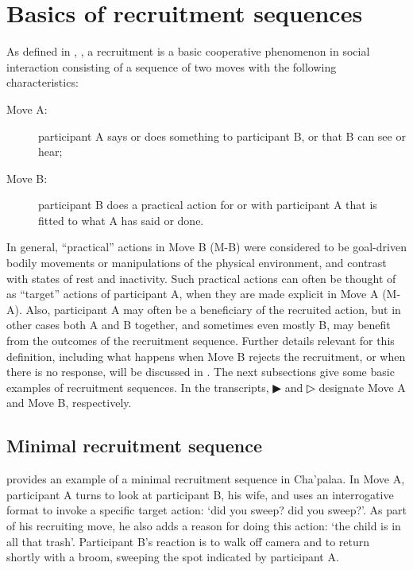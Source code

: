 \documentclass[output=paper]{langsci/langscibook}
\begin{document}
\section{Basics of recruitment sequences}\label{sec:floyd:2}

As defined in , , a recruitment is a basic cooperative phenomenon in social interaction consisting of a sequence of two moves with the following characteristics:

\begin{description}
\item[Move A:] participant A says or does something to participant B, or that B can see or hear;
\item[Move B:] participant B does a practical action for or with participant A that is fitted to what A has said or done.
\end{description}

In general, “practical” actions in Move B (M-B) were considered to be goal-driven bodily movements or manipulations of the physical environment, and contrast with states of rest and inactivity. Such practical actions can often be thought of as “target” actions of participant A, when they are made explicit in Move A (M-A). Also, participant A may often be a beneficiary of the recruited action, but in other cases both A and B together, and sometimes even mostly B, may benefit from the outcomes of the recruitment sequence. Further details relevant for this definition, including what happens when Move B rejects the recruitment, or when there is no response, will be discussed in . The next subsections give some basic examples of recruitment sequences. In the transcripts, ▶ and ▷ designate Move A and Move B, respectively.

\subsection{Minimal recruitment sequence}\label{sec:floyd:2.1}

 provides an example of a minimal recruitment sequence in Cha’palaa. In Move A, participant A turns to look at participant B, his wife, and uses an interrogative format to invoke a specific target action: ‘did you sweep? did you sweep?’. As part of his recruiting move, he also adds a reason for doing this action: ‘the child is in all that trash’. Participant B’s reaction is to walk off camera and to return shortly with a broom, sweeping the spot indicated by participant A.
\end{document}
